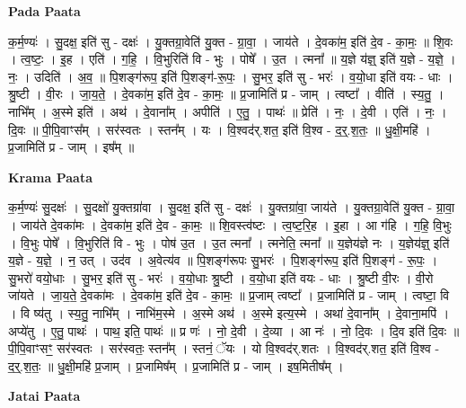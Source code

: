 \documentclass[17pt]{extarticle}
\begin{document}
\textbf{Pada Paata} \newline

क॒र्म॒ण्यः॑ । सु॒दक्ष॒ इति॑ सु - दक्षः॑ । यु॒क्तग्रा॒वेति॑ यु॒क्त - ग्रा॒वा॒ । जाय॑ते । दे॒वका॑म॒ इति॑ दे॒व - का॒मः॒ ॥ शि॒वः । त्व॒ष्टः॒ । इ॒ह । एति॑ । ग॒हि॒ । वि॒भुरिति॑ वि - भुः । पोषे᳚ । उ॒त । त्मना᳚ ॥ य॒ज्ञे य॑ज्ञ्॒ इति॑ य॒ज्ञे - य॒ज्ञे॒ । नः॒ । उदिति॑ । अ॒व॒ ॥ पि॒शङ्ग॑रूप॒ इति॑ पि॒शङ्ग॑-रू॒पः॒ । सु॒भर॒ इति॑ सु - भरः॑ । व॒यो॒धा इति॑ वयः - धाः । श्रु॒ष्टी । वी॒रः । जा॒य॒ते॒ । दे॒वका॑म॒ इति॑ दे॒व - का॒मः॒ ॥ प्र॒जामिति॑ प्र - जाम् । त्वष्टा᳚ । वीति॑ । स्य॒तु॒ । नाभि᳚म् । अ॒स्मे इति॑ । अथ॑ । दे॒वाना᳚म् । अपीति॑ । ए॒तु॒ । पाथः॑ ॥ प्रेति॑ । नः॒ । दे॒वी । एति॑ । नः॒ । दि॒वः ॥ पी॒पि॒वाꣳस᳚म् । सर॑स्वतः । स्तन᳚म् । यः । वि॒श्वद॑र्.शत॒ इति॑ वि॒श्व - द॒र्॒.श॒तः॒ ॥ धु॒क्षी॒महि॑ । प्र॒जामिति॑ प्र - जाम् । इष᳚म् ॥  \newline


\textbf{Krama Paata} \newline

क॒र्म॒ण्यः॑ सु॒दक्षः॑ । सु॒दक्षो॑ यु॒क्तग्रा॑वा । सु॒दक्ष॒ इति॑ सु - दक्षः॑ । यु॒क्तग्रा॑वा॒ जाय॑ते । यु॒क्तग्रा॒वेति॑ यु॒क्त - ग्रा॒वा॒ । जाय॑ते दे॒वका॑मः । दे॒वका॑म॒ इति॑ दे॒व - का॒मः॒ ॥ शि॒वस्त्व॑ष्टः । त्व॒ष्ट॒रि॒ह । इ॒हा । आ ग॑हि । ग॒हि॒ वि॒भुः । वि॒भुः पोषे᳚ । वि॒भुरिति॑ वि - भुः । पोष॑ उ॒त । उ॒त त्मना᳚ । त्मनेति॒ त्मना᳚ ॥ य॒ज्ञेय॑ज्ञे नः । य॒ज्ञेय॑ज्ञ्॒ इति॑ य॒ज्ञे - य॒ज्ञे॒ । न॒ उत् । उद॑व । अ॒वेत्य॑व ॥ पि॒शङ्ग॑रूपः सु॒भरः॑ । पि॒शङ्ग॑रूप॒ इति॑ पि॒शङ्ग॑ - रू॒पः॒ । सु॒भरो॑ वयो॒धाः । सु॒भर॒ इति॑ सु - भरः॑ । व॒यो॒धाः श्रु॒ष्टी । व॒यो॒धा इति॑ वयः - धाः । श्रु॒ष्टी वी॒रः । वी॒रो जा॑यते । जा॒य॒ते॒ दे॒वका॑मः । दे॒वका॑म॒ इति॑ दे॒व - का॒मः॒ ॥ प्र॒जाम् त्वष्टा᳚ । प्र॒जामिति॑ प्र - जाम् । त्वष्टा॒ वि । वि ष्य॑तु । स्य॒तु॒ नाभि᳚म् । नाभि॑म॒स्मे । अ॒स्मे अथ॑ । अ॒स्मे इत्य॒स्मे । अथा॑ दे॒वाना᳚म् । दे॒वाना॒मपि॑ । अप्ये॑तु । ए॒तु॒ पाथः॑ । पाथ॒ इति॒ पाथः॑ ॥ प्र णः॑ । नो॒ दे॒वी । दे॒व्या । आ नः॑ । नो॒ दि॒वः । दि॒व इति॑ दि॒वः ॥ पी॒पि॒वाꣳसꣳ॒॒ सर॑स्वतः । सर॑स्वतः॒ स्तन᳚म् । स्तनं॒ ॅयः । यो वि॒श्वद॑र्.शतः । वि॒श्वद॑र्.शत॒ इति॑ वि॒श्व - द॒र्॒.श॒तः॒ ॥ धु॒क्षी॒महि॑ प्र॒जाम् । प्र॒जामिष᳚म् । प्र॒जामिति॑ प्र - जाम् । इष॒मितीष᳚म् । \newline

\textbf{Jatai Paata} \newline
\end{document}
